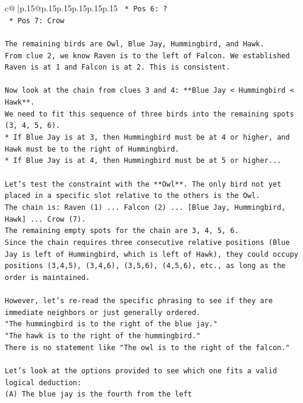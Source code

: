 \documentclass{article}
\begin{document}
{\begin{supertabular}{c@{$\;$}|p{.15\linewidth}@{}p{.15\linewidth}p{.15\linewidth}p{.15\linewidth}p{.15\linewidth}p{.15\linewidth}}
{{{\texttt{    *   Pos 6: ?} \\
\texttt{    *   Pos 7: Crow} \\
\\ 
\texttt{The remaining birds are Owl, Blue Jay, Hummingbird, and Hawk.} \\
\texttt{From clue 2, we know Raven is to the left of Falcon. We established Raven is at 1 and Falcon is at 2. This is consistent.} \\
\\ 
\texttt{Now look at the chain from clues 3 and 4: **Blue Jay < Hummingbird < Hawk**.} \\
\texttt{We need to fit this sequence of three birds into the remaining spots (3, 4, 5, 6).} \\
\texttt{*   If Blue Jay is at 3, then Hummingbird must be at 4 or higher, and Hawk must be to the right of Hummingbird.} \\
\texttt{*   If Blue Jay is at 4, then Hummingbird must be at 5 or higher...} \\
\\ 
\texttt{Let's test the constraint with the **Owl**. The only bird not yet placed in a specific slot relative to the others is the Owl.} \\
\texttt{The chain is: Raven (1) ... Falcon (2) ... {[}Blue Jay, Hummingbird, Hawk{]} ... Crow (7).} \\
\texttt{The remaining empty spots for the chain are 3, 4, 5, 6.} \\
\texttt{Since the chain requires three consecutive relative positions (Blue Jay is left of Hummingbird, which is left of Hawk), they could occupy positions (3,4,5), (3,4,6), (3,5,6), (4,5,6), etc., as long as the order is maintained.} \\
\\ 
\texttt{However, let's re{-}read the specific phrasing to see if they are immediate neighbors or just generally ordered.} \\
\texttt{"The hummingbird is to the right of the blue jay."} \\
\texttt{"The hawk is to the right of the hummingbird."} \\
\texttt{There is no statement like "The owl is to the right of the falcon."} \\
\\ 
\texttt{Let's look at the options provided to see which one fits a valid logical deduction:} \\
\texttt{(A) The blue jay is the fourth from the left} \\
}}}
\end{supertabular}}
\end{document}
